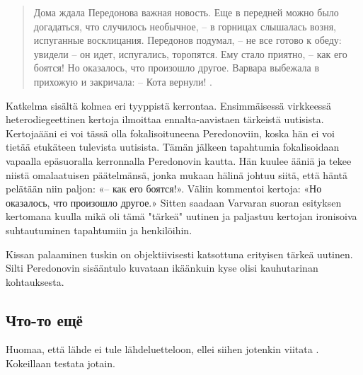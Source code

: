 \documentclass[12pt,a4paper]{article}
\begin{document}
\begin{quote}
Дома ждала Передонова важная новость. Еще в передней можно
было догадаться, что случилось необычное, – в горницах слышалась 
возня, испуганные восклицания. Передонов подумал, – не все
готово к обеду: увидели – он идет, испугались, торопятся. Ему стало
приятно, – как его боятся! Но оказалось, что произошло другое. 
Варвара выбежала в прихожую и закричала: 
– Кота вернули!
\parencite[171]{sologub2004}.
\end{quote}

Katkelma sisältä kolmea eri tyyppistä kerrontaa. Ensimmäisessä virkkeessä
heterodiegeettinen kertoja ilmoittaa ennalta-aavistaen tärkeistä uutisista.
Kertojaääni ei voi tässä olla fokalisoituneena Peredonoviin, koska
hän ei voi tietää etukäteen tulevista uutisista. Tämän jälkeen tapahtumia
fokalisoidaan vapaalla epäsuoralla kerronnalla Peredonovin kautta. Hän
kuulee ääniä ja tekee niistä omalaatuisen päätelmänsä, jonka mukaan hälinä
johtuu siitä, että häntä pelätään niin paljon: «– как его боятся!». Väliin 
kommentoi kertoja: «Но оказалось, что произошло другое.» Sitten saadaan
Varvaran suoran esityksen kertomana kuulla mikä oli tämä "tärkeä" uutinen ja
paljastuu kertojan ironisoiva suhtautuminen tapahtumiin ja henkilöihin.

Kissan palaaminen tuskin on objektiivisesti katsottuna erityisen tärkeä uutinen.
Silti Peredonovin sisääntulo kuvataan ikäänkuin kyse olisi kauhutarinan 
kohtauksesta.

\subsection{Что-то ещё}

Huomaa, että lähde ei tule lähdeluetteloon, ellei siihen jotenkin
viitata \parencite[55]{artjunova1983}. Kokeillaan testata jotain.


\printbibliography[heading=bibintoc,title={Список использоваемой литературы}]
\end{document}
